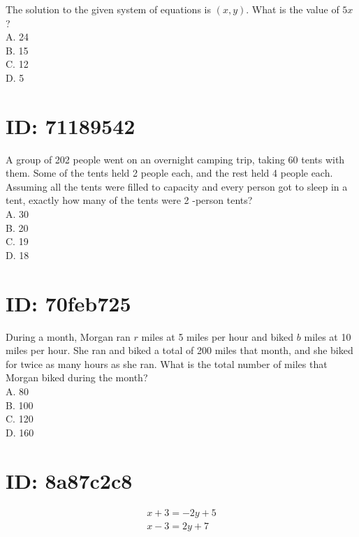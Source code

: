 The solution to the given system of equations is $(x, y)$. What is the value of $5 x$ ?\\
A. 24\\
B. 15\\
C. 12\\
D. 5

\section*{ID: 71189542}
A group of 202 people went on an overnight camping trip, taking 60 tents with them. Some of the tents held 2 people each, and the rest held 4 people each. Assuming all the tents were filled to capacity and every person got to sleep in a tent, exactly how many of the tents were 2 -person tents?\\
A. 30\\
B. 20\\
C. 19\\
D. 18




































\section*{ID: 70feb725}
During a month, Morgan ran $r$ miles at 5 miles per hour and biked $b$ miles at 10 miles per hour. She ran and biked a total of 200 miles that month, and she biked for twice as many hours as she ran. What is the total number of miles that Morgan biked during the month?\\
A. 80\\
B. 100\\
C. 120\\
D. 160

\section*{ID: 8a87c2c8}
$$
\begin{gathered}
x+3=-2 y+5 \\
x-3=2 y+7
\end{gathered}
$$

